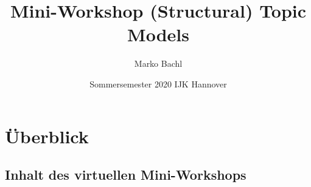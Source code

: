 \documentclass[
]{book}
\title{Mini-Workshop (Structural) Topic Models}
\author{Marko Bachl}
\date{Sommersemester 2020 \textbar{} IJK Hannover}
\begin{document}
\maketitle

{
\setcounter{tocdepth}{1}
\tableofcontents
}
\hypertarget{uxfcberblick}{%
\chapter{Überblick}\label{uxfcberblick}}

\hypertarget{inhalt-des-virtuellen-mini-workshops}{%
\section{Inhalt des virtuellen Mini-Workshops}\label{inhalt-des-virtuellen-mini-workshops}}
\end{document}
